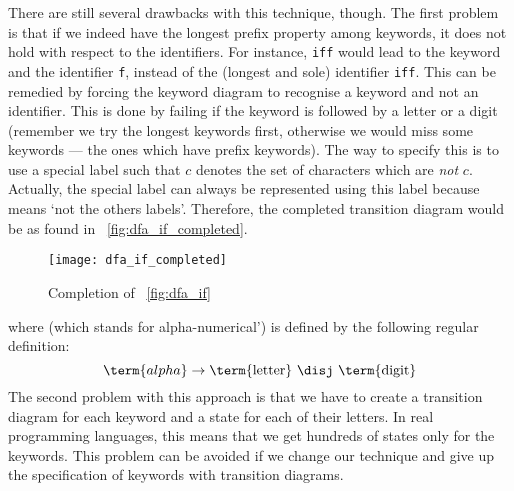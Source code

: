 There are still several drawbacks with this technique, though. The
first problem is that if we indeed have the longest prefix property
among keywords, it does not hold with respect to the identifiers. For
instance, \texttt{iff} would lead to the keyword  and the
identifier \texttt{f}, instead of the (longest and sole) identifier
\texttt{iff}. This can be remedied by forcing the keyword diagram to
recognise a keyword and not an identifier. This is done by failing if
the keyword is followed by a letter or a digit (remember we try the
longest keywords first, otherwise we would miss some keywords --- the
ones which have prefix keywords). The way to specify this is to use a
special label \compl such that \compl \(c\) denotes the set of
characters which are \emph{not} \(c\). Actually, the special label
\other can always be represented using this \compl label because
\other means `not the others labels'. Therefore, the completed
 transition diagram would be as found in
\fig~\vref{fig:dfa_if_completed}.
\begin{figure}
\centering
\texttt{[image: dfa\_if\_completed]}
\caption{Completion of \fig~\vref{fig:dfa_if}}
\label{fig:dfa_if_completed}
\end{figure}
where  (which stands for alpha-numerical') is defined by
the following regular definition:
\begin{equation*}
\term{alpha} \rightarrow \text{\term{letter} \disj \term{digit}}
\end{equation*}
The second problem with this approach is that we have to create a
transition diagram for each keyword and a state for each of their
letters. In real programming languages, this means that we get
hundreds of states only for the keywords. This problem can be avoided
if we change our technique and give up the specification of keywords
with transition diagrams.

